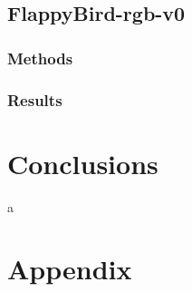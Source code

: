 \documentclass[11pt,a4paper,twocolumn]{IEEEtran}
\begin{document}
		\subsection{\textbf{FlappyBird-rgb-v0}}
			\subsubsection{\textbf{Methods}}
			\subsubsection{\textbf{Results}}
		
	\section{\textbf{Conclusions}}
	
	\newpage
	a
	\newpage
	\onecolumn
	\section{\textbf{Appendix}}
\end{document}
